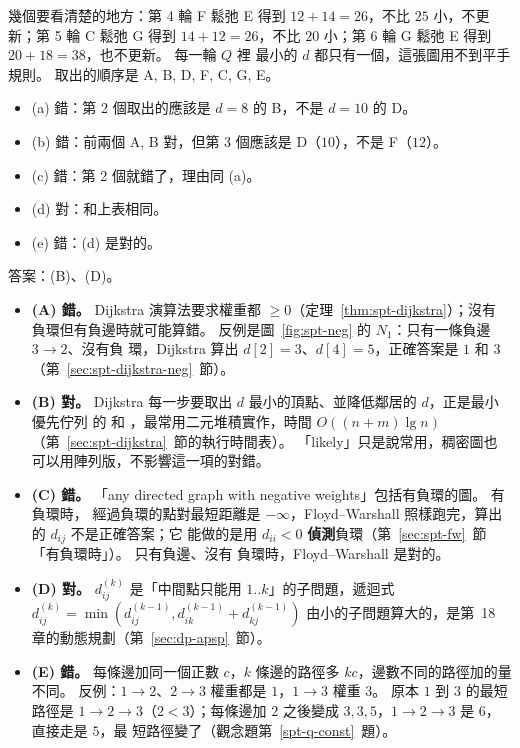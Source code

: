 幾個要看清楚的地方：第 4 輪 F 鬆弛 E 得到 $12 + 14 = 26$，不比 $25$ 小，不更新；第 5 輪 C 鬆弛 G
得到 $14 + 12 = 26$，不比 $20$ 小；第 6 輪 G 鬆弛 E 得到 $20 + 18 = 38$，也不更新。 每一輪 $Q$ 裡
最小的 $d$ 都只有一個，這張圖用不到平手規則。 取出的順序是 A, B, D, F, C, G, E。

\begin{itemize}
\item (a) 錯：第 2 個取出的應該是 $d = 8$ 的 B，不是 $d = 10$ 的 D。
\item (b) 錯：前兩個 A, B 對，但第 3 個應該是 D（$10$），不是 F（$12$）。
\item (c) 錯：第 2 個就錯了，理由同 (a)。
\item (d) 對：和上表相同。
\item (e) 錯：(d) 是對的。
\end{itemize}

答案：(B)、(D)。

\begin{itemize}
\item \textbf{(A) 錯。} Dijkstra 演算法要求權重都 $\ge 0$（定理~\ref{thm:spt-dijkstra}）；沒有
負環但有負邊時就可能算錯。 反例是圖~\ref{fig:spt-neg} 的 $N_1$：只有一條負邊 $3 \to 2$、沒有負
環，Dijkstra 算出 $d[2] = 3$、$d[4] = 5$，正確答案是 $1$ 和 $3$（第~\ref{sec:spt-dijkstra-neg}~節）。
\item \textbf{(B) 對。} Dijkstra 每一步要取出 $d$ 最小的頂點、並降低鄰居的 $d$，正是最小優先佇列
的  和 ，最常用二元堆積實作，時間
$O((n + m) \lg n)$（第~\ref{sec:spt-dijkstra}~節的執行時間表）。 「likely」只是說常用，稠密圖也
可以用陣列版，不影響這一項的對錯。
\item \textbf{(C) 錯。} 「any directed graph with negative weights」包括有負環的圖。 有負環時，
經過負環的點對最短距離是 $-\infty$，Floyd--Warshall 照樣跑完，算出的 $d_{ij}$ 不是正確答案；它
能做的是用 $d_{ii} < 0$ \textbf{偵測}負環（第~\ref{sec:spt-fw}~節「有負環時」）。 只有負邊、沒有
負環時，Floyd--Warshall 是對的。
\item \textbf{(D) 對。} $d_{ij}^{(k)}$ 是「中間點只能用 $1..k$」的子問題，遞迴式
$d_{ij}^{(k)} = \min(d_{ij}^{(k-1)}, d_{ik}^{(k-1)} + d_{kj}^{(k-1)})$ 由小的子問題算大的，是第~18~
章的動態規劃（第~\ref{sec:dp-apsp}~節）。
\item \textbf{(E) 錯。} 每條邊加同一個正數 $c$，$k$ 條邊的路徑多 $kc$，邊數不同的路徑加的量不同。
反例：$1 \to 2$、$2 \to 3$ 權重都是 $1$，$1 \to 3$ 權重 $3$。 原本 $1$ 到 $3$ 的最短路徑是
$1 \to 2 \to 3$（$2 < 3$）；每條邊加 $2$ 之後變成 $3, 3, 5$，$1 \to 2 \to 3$ 是 $6$，直接走是 $5$，最
短路徑變了（觀念題第~\ref{spt-q-const}~題）。
\end{itemize}

